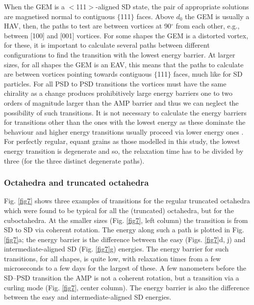 When the GEM is a $<$111$>$-aligned SD state, the pair of appropriate solutions are magnetised normal to contiguous $\{$111$\}$ faces. Above $d_0$ the GEM is usually a HAV, then, the paths to test are between vortices at 90$^{\circ}$ from each other, e.g., between [100] and [001] vortices. For some shapes the GEM is a distorted vortex, for these, it is important to calculate several paths between different configurations to find the transition with the lowest energy barrier. At larger sizes, for all shapes the GEM is an EAV, this means that the paths to calculate are between vortices pointing towards contiguous $\{$111$\}$ faces, much like for SD particles. For all PSD to PSD transitions the vortices must have the same chirality as a change produces prohibitively large energy barriers one to two orders of magnitude larger than the AMP barrier and thus we can neglect the possibility of such transitions. It is not necessary to calculate the energy barriers for transitions other than the ones with the lowest energy as these dominate the behaviour and higher energy transitions usually proceed via lower energy ones \citep{Nagy2017}. For perfectly regular, equant grains as those modelled in this study, the lowest energy transition is degenerate and so, the relaxation time has to be divided by three (for the three distinct degenerate paths).\par

\subsubsection{Octahedra and truncated octahedra}
Fig. \ref{fig7} shows three examples of transitions for the regular truncated octahedra which were found to be typical for all the (truncated) octahedra, but for the cuboctahedra. At the smaller sizes (Fig. \ref{fig7}, left column) the transition is from SD to SD via coherent rotation. The energy along such a path is plotted in Fig. \ref{fig7}a; the energy barrier is the difference between the easy (Figs. \ref{fig7}d, j) and intermediate-aligned SD (Fig. \ref{fig7}g) energies. The energy barrier for such transitions, for all shapes, is quite low, with relaxation times from a few microseconds to a few days for the largest of these. A few nanometers before the SD--PSD transition the AMP is not a coherent rotation, but a transition via a curling mode (Fig. \ref{fig7}, center column). The energy barrier is also the difference between the easy and intermediate-aligned SD energies.\par

